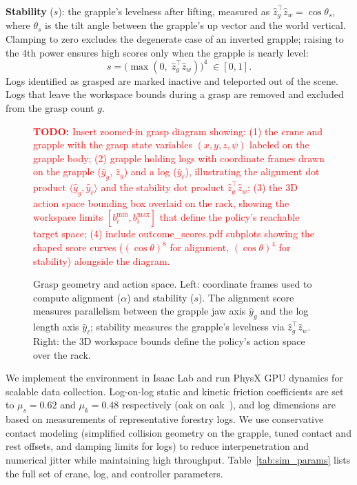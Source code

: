 \documentclass[conference]{IEEEtran}
\newcommand{\TODO}[1]{\textcolor{red}{\textbf{TODO:} #1}}
\begin{document}
\textbf{Stability} ($s$): the grapple's levelness after lifting, measured as $\hat{z}_g^\top \hat{z}_w = \cos\theta_s$, where $\theta_s$ is the tilt angle between the grapple's up vector and the world vertical.
Clamping to zero excludes the degenerate case of an inverted grapple; raising to the 4th power ensures high scores only when the grapple is nearly level:
\begin{equation}
    s = \big(\max(0,\;\hat{z}_g^\top \hat{z}_w)\big)^{4} \;\in [0,1].
\end{equation}
Logs identified as grasped are marked inactive and teleported out of the scene.
Logs that leave the workspace bounds during a grasp are removed and excluded from the grasp count $g$.

\begin{figure}[t]
\centering
\TODO{Insert zoomed-in grasp diagram showing: (1) the crane and grapple with the grasp state variables $(x,y,z,\psi)$ labeled on the grapple body; (2) grapple holding logs with coordinate frames drawn on the grapple ($\hat{y}_g$, $\hat{z}_g$) and a log ($\hat{y}_\ell$), illustrating the alignment dot product $\langle \hat{y}_g, \hat{y}_\ell \rangle$ and the stability dot product $\hat{z}_g^\top \hat{z}_w$; (3) the 3D action space bounding box overlaid on the rack, showing the workspace limits $[b_i^{\min}, b_i^{\max}]$ that define the policy's reachable target space; (4) include outcome\_scores.pdf subplots showing the shaped score curves ($(\cos\theta)^8$ for alignment, $(\cos\theta)^4$ for stability) alongside the diagram.}
\caption{Grasp geometry and action space. Left: coordinate frames used to compute alignment ($\alpha$) and stability ($s$). The alignment score measures parallelism between the grapple jaw axis $\hat{y}_g$ and the log length axis $\hat{y}_\ell$; stability measures the grapple's levelness via $\hat{z}_g^\top \hat{z}_w$. Right: the 3D workspace bounds define the policy's action space over the rack.}
\label{fig:grasp_geometry}
\end{figure}

We implement the environment in Isaac Lab and run PhysX GPU dynamics for scalable data collection.
Log-on-log static and kinetic friction coefficients are set to $\mu_s = 0.62$ and $\mu_k = 0.48$ respectively (oak on oak~\cite{avallone2006marks}), and log dimensions are based on measurements of representative forestry logs.
We use conservative contact modeling (simplified collision geometry on the grapple, tuned contact and rest offsets, and damping limits for logs) to reduce interpenetration and numerical jitter while maintaining high throughput.
Table~\ref{tab:sim_params} lists the full set of crane, log, and controller parameters.
\end{document}
